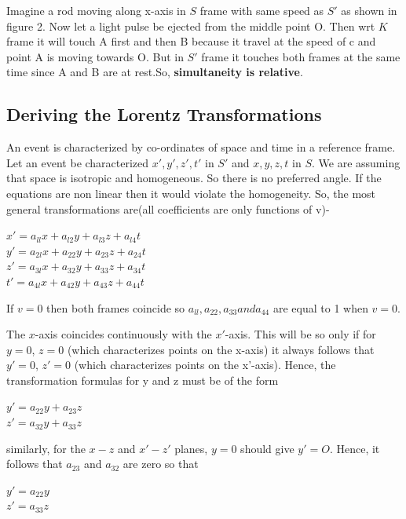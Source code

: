 \documentclass[12pt,a4paper]{article}
\numberwithin{table}{section}
\numberwithin{figure}{section}
\numberwithin{equation}{section}
\theoremstyle{remark}
\theoremstyle{definition}
\begin{document}
Imagine a rod moving along x-axis in $S$ frame with same speed as $ S'$ as shown in figure 2. Now let a light pulse be ejected from the middle point O. Then wrt $K$ frame it will touch A first and then B because it travel at the speed of c and point A is moving towards O. But in $S'$ frame it touches both frames at the same time since A and B are at rest.So, \textbf{simultaneity is relative}.


\subsection{Deriving the Lorentz Transformations}
An event is characterized by co-ordinates of space and time in a reference frame. Let an event be characterized ${x',y',z',t'}$ in $S'$ and ${x,y,z,t}$ in $S$. We are assuming that space is isotropic and homogeneous. So there is no preferred angle. If the equations are non linear then it would violate the homogeneity. So, the most general transformations are(all coefficients are only functions of v)-
\begin{center}
$x' = a_{ll}x + a_{l2}y + a_{l3}z + a_{l4}t$\\
$y' = a_{2l}x + a_{22}y + a_{23}z + a_{24}t$\\
$z' = a_{3l}x + a_{32}y + a_{33}z + a_{34}t$\\
$t' = a_{4l}x + a_{42}y + a_{43}z + a_{44}t$\\
\end{center}

If $v=0$ then both frames coincide so $a_{ll},a_{22},a_{33} and a_{44}$ are equal to 1 when $v=0$.

The $x$-axis coincides continuously with the $x'$-axis. This will be so 
only if for $y = 0$, $z = 0$ (which characterizes points on the x-axis) it 
always follows that $y' = 0$, $z' = 0$ (which characterizes points on the 
x'-axis). Hence, the transformation formulas for y and z must be of the 
form 
\begin{center}
$y' = a_{22}y + a_{23}z$\\
$z' = a_{32}y + a_{33}z$\\
\end{center}
similarly, for the $x-z$ and $x' -z'$ planes, $y = 0$ should give $y' = O$. Hence, it follows that $a_{23}$ and $a_{32}$  are zero so that
\begin{center}
$y' = a_{22}y$\\
$z' = a_{33}z$\\
\end{center}
\end{document}

